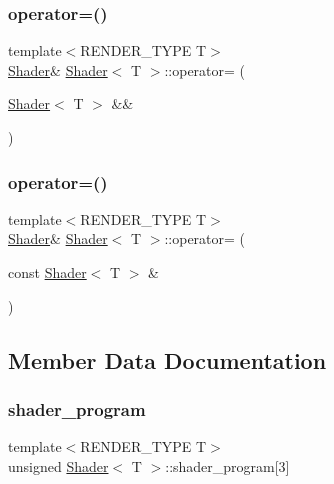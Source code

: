 \subsubsection{\texorpdfstring{operator=()}{operator=()}\hspace{0.1cm}{\footnotesize\ttfamily [1/2]}}
{\footnotesize\ttfamily template$<$R\+E\+N\+D\+E\+R\+\_\+\+T\+Y\+PE T$>$ \\
\mbox{\hyperlink{classShader}{Shader}}\& \mbox{\hyperlink{classShader}{Shader}}$<$ T $>$\+::operator= (\begin{DoxyParamCaption}\item[{\mbox{\hyperlink{classShader}{Shader}}$<$ T $>$ \&\&}]{ }\end{DoxyParamCaption})\hspace{0.3cm}{\ttfamily [delete]}}

\mbox{\label{classShader_a58f724fecccecdb1633e08ce0258da37}} 
\subsubsection{\texorpdfstring{operator=()}{operator=()}\hspace{0.1cm}{\footnotesize\ttfamily [2/2]}}
{\footnotesize\ttfamily template$<$R\+E\+N\+D\+E\+R\+\_\+\+T\+Y\+PE T$>$ \\
\mbox{\hyperlink{classShader}{Shader}}\& \mbox{\hyperlink{classShader}{Shader}}$<$ T $>$\+::operator= (\begin{DoxyParamCaption}\item[{const \mbox{\hyperlink{classShader}{Shader}}$<$ T $>$ \&}]{ }\end{DoxyParamCaption})\hspace{0.3cm}{\ttfamily [delete]}}



\subsection{Member Data Documentation}
\mbox{\label{classShader_af8ec4edd2b1b56f32ce416280ff9b9e1}} 
\subsubsection{\texorpdfstring{shader\+\_\+program}{shader\_program}}
{\footnotesize\ttfamily template$<$R\+E\+N\+D\+E\+R\+\_\+\+T\+Y\+PE T$>$ \\
unsigned \mbox{\hyperlink{classShader}{Shader}}$<$ T $>$\+::shader\+\_\+program\mbox{[}3\mbox{]}\hspace{0.3cm}{\ttfamily [protected]}}


